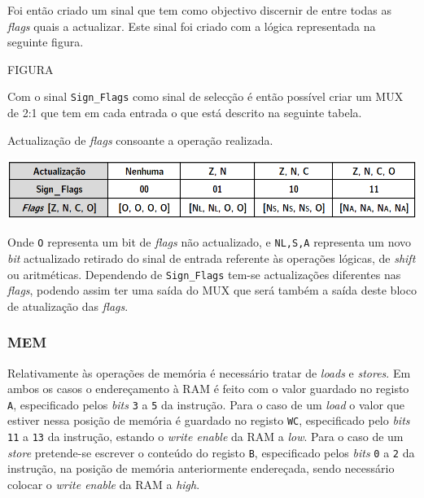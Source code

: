 \documentclass[11pt]{article}
\numberwithin{equation}{section}
\begin{document}
Foi então criado um sinal que tem como objectivo discernir de entre todas as \textit{flags} quais a actualizar. Este sinal foi criado com a lógica representada na seguinte figura.

FIGURA

Com o sinal \texttt{Sign\_Flags} como sinal de selecção é então possível criar um MUX de 2:1 que tem em cada entrada o que está descrito na seguinte tabela.

\vspace{1.5mm}
\begin{table}[h]
	\centering
	\caption{Actualização de \textit{flags} consoante a operação realizada.}
	\vspace{-2mm}
 	\includegraphics[width=1\linewidth]{tabelas/tabelaFlags}
\end{table}

Onde \texttt{O} representa um bit de \textit{flags} não actualizado, e \texttt{N{\scriptsize {L,S,A}}} representa um novo \textit{bit} actualizado retirado do sinal de entrada referente às operações lógicas, de \textit{shift} ou aritméticas. Dependendo de \texttt{Sign\_Flags} tem-se actualizações diferentes nas \textit{flags}, podendo assim ter uma saída do MUX que será também a saída deste bloco de atualização das \textit{flags}.

\subsubsection{MEM}

Relativamente às operações de memória é necessário tratar de \textit{loads} e \textit{stores}. Em ambos os casos o endereçamento à RAM é feito com o valor guardado no registo \texttt{A}, especificado pelos \textit{bits} \texttt{3} a \texttt{5} da instrução. Para o caso de um \textit{load} o valor que estiver nessa posição de memória é guardado no registo \texttt{WC}, especificado pelo \textit{bits} \texttt{11} a \texttt{13} da instrução, estando o \textit{write enable} da RAM a \textit{low}. Para o caso de um \textit{store} pretende-se escrever o conteúdo do registo \texttt{B}, especificado pelos \textit{bits} \texttt{0} a \texttt{2} da instrução, na posição de memória anteriormente endereçada, sendo necessário colocar o \textit{write enable} da RAM a \textit{high}. 
\end{document}
